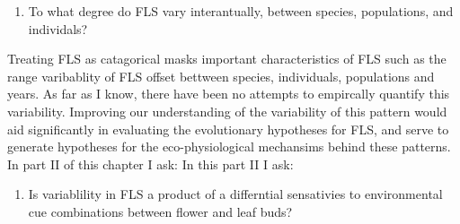 \documentclass{article}\usepackage[]{graphicx}\usepackage[]{color}
\begin{document}
{{\begin{enumerate}
\item To what degree do FLS vary interantually, between species, populations, and individals?
\end{enumerate}
Treating FLS as catagorical masks important characteristics of FLS such as the range varibablity of FLS offset bettween species, individuals, populations and years. As far as I know, there have been no attempts to empircally quantify this variability. Improving our understanding of the variability of this pattern would aid significantly in evaluating the evolutionary hypotheses for FLS, and serve to generate hypotheses for the eco-physiological mechansims behind these patterns. In part II of this chapter I ask:
 In this part II I ask:
\begin{enumerate}
\item Is variablility in FLS a product of a differntial sensativies to environmental cue combinations between flower and leaf buds?
\end{enumerate}

}}
\end{document}
